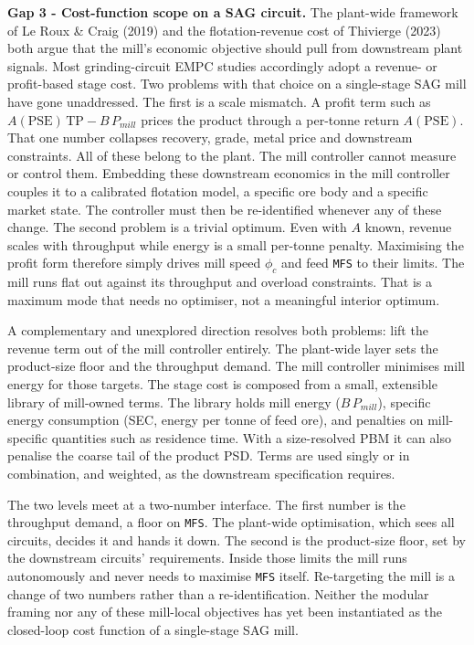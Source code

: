 \documentclass[
  14pt,
]{extarticle}
\begin{document}
\textbf{Gap 3 - Cost-function scope on a SAG circuit.} The plant-wide
framework of Le Roux \& Craig (2019) and the flotation-revenue cost of
Thivierge (2023) both argue that the mill's economic objective should
pull from downstream plant signals. Most grinding-circuit EMPC studies
accordingly adopt a revenue- or profit-based stage cost. Two problems
with that choice on a single-stage SAG mill have gone unaddressed. The
first is a scale mismatch. A profit term such as
$A(\mathrm{PSE})\,\mathrm{TP}-B\,P_{mill}$ prices the product through a per-tonne
return $A(\mathrm{PSE})$. That one number collapses recovery, grade, metal
price and downstream constraints. All of these belong to the plant. The
mill controller cannot measure or control them. Embedding these
downstream economics in the mill controller couples it to a calibrated
flotation model, a specific ore body and a specific market state. The
controller must then be re-identified whenever any of these change. The
second problem is a trivial optimum. Even with $A$ known, revenue
scales with throughput while energy is a small per-tonne penalty.
Maximising the profit form therefore simply drives mill speed
$\phi_c$ and feed \texttt{MFS} to their limits. The mill runs
flat out against its throughput and overload constraints. That is a
maximum mode that needs no optimiser, not a meaningful interior optimum.

A complementary and unexplored direction resolves both problems: lift
the revenue term out of the mill controller entirely. The plant-wide
layer sets the product-size floor and the throughput demand. The mill
controller minimises mill energy for those targets. The stage cost is
composed from a small, extensible library of mill-owned terms. The
library holds mill energy ($B\,P_{mill}$), specific energy consumption
(SEC, energy per tonne of feed ore), and penalties on mill-specific
quantities such as residence time. With a size-resolved PBM it can also
penalise the coarse tail of the product PSD. Terms are used singly or in
combination, and weighted, as the downstream specification requires.

The two levels meet at a two-number interface. The first number is the
throughput demand, a floor on \texttt{MFS}. The plant-wide
optimisation, which sees all circuits, decides it and hands it down. The
second is the product-size floor, set by the downstream circuits'
requirements. Inside those limits the mill runs autonomously and never
needs to maximise \texttt{MFS} itself. Re-targeting the mill is a
change of two numbers rather than a re-identification. Neither the
modular framing nor any of these mill-local objectives has yet been
instantiated as the closed-loop cost function of a single-stage SAG
mill.
\end{document}
